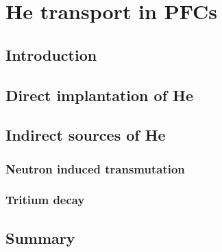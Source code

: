 \chapter{He transport in PFCs}
\label{Chapter4} %

\section{Introduction}

\section{Direct implantation of He}

\section{Indirect sources of He}
\subsection{Neutron induced transmutation}

\subsection{Tritium decay}

\section{Summary}